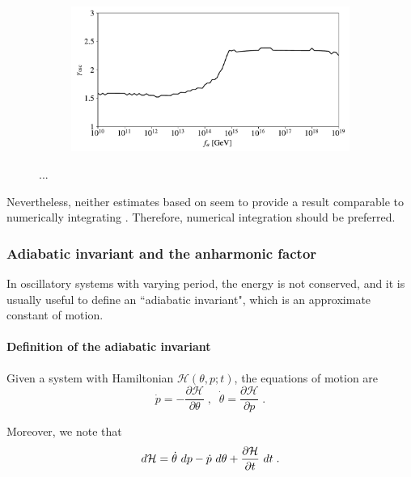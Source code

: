 \documentclass[11pt,a4paper]{article}
\begin{document}
\begin{figure}[t]
\begin{center}
\begin{subfigure}[]{0.5\textwidth}
		\includegraphics[width=1\textwidth]{figs/gamma_osc.pdf}
		\caption{}
		\label{fig:gamma_osc}
	\end{subfigure}
	\end{center}
\caption{...}
\label{fig:WKB_diff}
\end{figure}
%

Nevertheless, neither estimates based on  seem to provide a result comparable to numerically integrating . Therefore, numerical integration should be preferred. 

\subsubsection{Adiabatic invariant and the anharmonic factor}\label{sec:an_fac}
%
In oscillatory systems with varying period, the energy is not conserved, and it is usually useful to define an ``adiabatic invariant", which is an approximate constant of motion.

\paragraph{Definition of the adiabatic invariant}
%
Given a system with Hamiltonian $\mathcal{H}(\theta,p;t)$, the equations of motion are 
%
\begin{equation}
	\dot p = - \dfrac{\partial \mathcal{H}}{\partial \theta} \;, \;\; 
	\dot \theta =  \dfrac{\partial \mathcal{H}}{\partial p} \;.
	\label{eq:hamiltonian_eoms}
\end{equation}

Moreover, we note that
%
\begin{equation}
	d \mathcal{H} = \dot \theta \ d p - \dot p \ d \theta + \dfrac{\partial \mathcal{H}}{\partial t} \ d t \;.  
	\label{eq:total_dH}
\end{equation}
\end{document}
